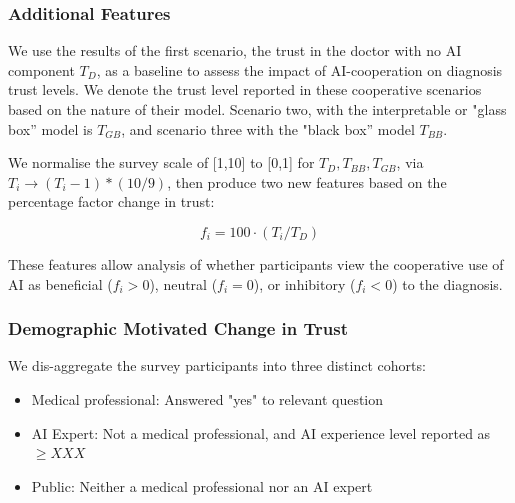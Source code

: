 \documentclass[manuscript,screen,review]{acmart}
\begin{document}



\subsubsection{Additional Features}

We use the results of the first scenario, the trust in the doctor with no AI component $T_D$, as a baseline to assess the impact of AI-cooperation on diagnosis trust levels. We denote the trust level reported in these cooperative scenarios based on the nature of their model. Scenario two, with the interpretable or "glass box'' model is $T_{GB}$, and scenario three with the "black box'' model $T_{BB}$.

We normalise the survey scale of [1,10] to [0,1] for $T_D, T_{BB}, T_{GB}$, via $T_i \rightarrow (T_i - 1) * (10/9)$, then produce two new features based on the percentage factor change in trust:

\begin{equation} \label{eqn:change_vs_doctor}
    f_i = 100 \cdot (T_i / T_D)
\end{equation}

These features allow analysis of whether participants view the cooperative use of AI as beneficial ($f_i > 0$), neutral ($f_i = 0$), or inhibitory ($f_i < 0$) to the diagnosis. 

\subsubsection{Demographic Motivated Change in Trust}





We dis-aggregate the survey participants into three distinct cohorts: 

\begin{itemize}
    \item Medical professional: Answered "yes" to relevant question
    \item AI Expert: Not a medical professional, and AI experience level reported as $\geq XXX$
    \item Public: Neither a medical professional nor an AI expert
\end{itemize}
\end{document}
